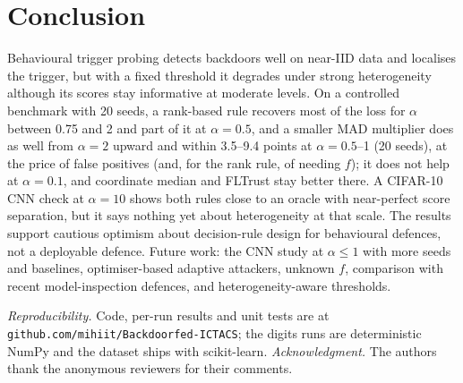 \section{Conclusion}
Behavioural trigger probing detects backdoors well on near-IID data and localises the trigger, but with a fixed threshold it degrades under strong heterogeneity although its scores stay informative at moderate levels. On a controlled benchmark with 20 seeds, a rank-based rule recovers most of the loss for $\alpha$ between 0.75 and 2 and part of it at $\alpha=0.5$, and a smaller MAD multiplier does as well from $\alpha=2$ upward and within 3.5--9.4 points at $\alpha=0.5$--1 (20 seeds), at the price of false positives (and, for the rank rule, of needing $f$); it does not help at $\alpha=0.1$, and coordinate median and FLTrust stay better there. A CIFAR-10 CNN check at $\alpha=10$ shows both rules close to an oracle with near-perfect score separation, but it says nothing yet about heterogeneity at that scale. The results support cautious optimism about decision-rule design for behavioural defences, not a deployable defence. Future work: the CNN study at $\alpha\le1$ with more seeds and baselines, optimiser-based adaptive attackers, unknown $f$, comparison with recent model-inspection defences, and heterogeneity-aware thresholds.

\textit{Reproducibility.} Code, per-run results and unit tests are at \texttt{github.com/mihiit/Backdoorfed-ICTACS}; the digits runs are deterministic NumPy and the dataset ships with scikit-learn. \textit{Acknowledgment.} The authors thank the anonymous reviewers for their comments.

